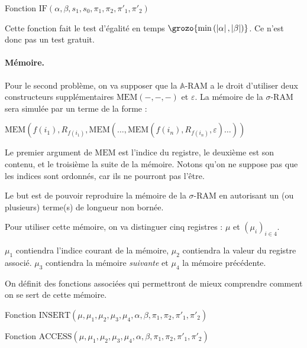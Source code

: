 \documentclass{article}
\newcommand{\bbA}{\mathbb{A}}
\begin{document}
\begin{demo}
\begin{algorithm}[H]
					\caption{Fonction $\text{IF}(\alpha, \beta, s_1, s_0, \pi_1, \pi_2, \pi'_1, \pi'_2)$}
				\end{algorithm}
				
				\espace
				
				Cette fonction fait le test d'égalité en temps $\grozo{\min\left(\left| \alpha \right|, \left| \beta \right|\right)}$. Ce n'est donc pas un test gratuit. 
				
				
				\paragraph{Mémoire.}
				Pour le second problème, on va supposer que la $\bbA$-RAM a le droit d'utiliser deux constructeurs supplémentaires $\text{MEM}(-,-,-)$ et $\varepsilon$. La mémoire de la $\sigma$-RAM sera simulée par un terme de la forme : 
				
				$\text{MEM}(f(i_1), R_{f(i_1)}, \text{MEM}( \dots, \text{MEM}(f(i_n), R_{f(i_n)}, \varepsilon) \dots ) )$
				
				Le premier argument de $\text{MEM}$ est l'indice du registre, le deuxième est son contenu, et le troisième la suite de la mémoire. Notons qu'on ne suppose pas que les indices sont ordonnés, car ils ne pourront pas l'être. 
				
				Le but est de pouvoir reproduire la mémoire de la $\sigma$-RAM en autorisant un (ou plusieurs) terme(s) de longueur non bornée. 
				
				Pour utiliser cette mémoire, on va distinguer cinq registres : $\mu$ et $\left( \mu_i \right)_{i \in 4}$.
				
				$\mu_1$ contiendra l'indice courant de la mémoire, $\mu_2$ contiendra la valeur du registre associé. $\mu_3$ contiendra la mémoire \emph{suivante} et $\mu_4$ la mémoire précédente.
				
				On définit des fonctions associées qui permettront de mieux comprendre comment on se sert de cette mémoire. 
				
				
				\begin{algorithm}[H]
					
					\caption{Fonction $\text{INSERT}\left( \mu, \mu_1, \mu_2, \mu_3, \mu_4, \alpha, \beta, \pi_1, \pi_2, \pi'_1, \pi'_2\right)$}
				\end{algorithm}
				
				\begin{algorithm}[H]
					\nepasoublier{¡TENGO PEREZA!}
					\caption{Fonction $\text{ACCESS}\left( \mu, \mu_1, \mu_2, \mu_3, \mu_4, \alpha, \beta, \pi_1, \pi_2, \pi'_1, \pi'_2\right)$}
				\end{algorithm}
				

\end{demo}
\end{document}
